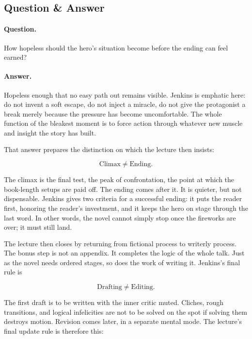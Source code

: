 \subsection{Question \& Answer}

\paragraph{Question.} How hopeless should the hero's situation become before the ending can feel earned?

\paragraph{Answer.} Hopeless enough that no easy path out remains visible. Jenkins is emphatic here: do not invent a soft escape, do not inject a miracle, do not give the protagonist a break merely because the pressure has become uncomfortable. The whole function of the bleakest moment is to force action through whatever new muscle and insight the story has built.

That answer prepares the distinction on which the lecture then insists:

\begin{equation}
\text{Climax} \neq \text{Ending}.
\end{equation}

The climax is the final test, the peak of confrontation, the point at which the book-length setups are paid off. The ending comes after it. It is quieter, but not dispensable. Jenkins gives two criteria for a successful ending: it puts the reader first, honoring the reader's investment, and it keeps the hero on stage through the last word. In other words, the novel cannot simply stop once the fireworks are over; it must still land.

The lecture then closes by returning from fictional process to writerly process. The bonus step is not an appendix. It completes the logic of the whole talk. Just as the novel needs ordered stages, so does the work of writing it. Jenkins's final rule is

\begin{equation}
\text{Drafting} \neq \text{Editing}.
\end{equation}

The first draft is to be written with the inner critic muted. Cliches, rough transitions, and logical infelicities are not to be solved on the spot if solving them destroys motion. Revision comes later, in a separate mental mode. The lecture's final update rule is therefore this:

